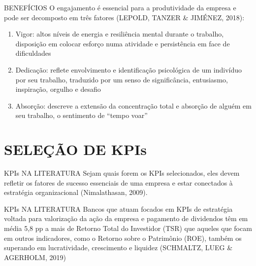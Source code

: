 \documentclass[
  ignorenonframetext,
]{beamer}
\providecommand{\tightlist}{%
  \setlength{\itemsep}{0pt}\setlength{\parskip}{0pt}}\usepackage{longtable,booktabs,array}
\begin{document}
\begin{frame}{BENEFÍCIOS}
\protect\hypertarget{benefuxedcios-2}{}
O engajamento é essencial para a produtividade da empresa e pode ser
decomposto em três fatores (LEPOLD, TANZER \& JIMÉNEZ, 2018):

\begin{enumerate}
\tightlist
\item
  Vigor: altos níveis de energia e resiliência mental durante o
  trabalho, disposição em colocar esforço numa atividade e persistência
  em face de dificuldades
\item
  Dedicação: reflete envolvimento e identificação psicológica de um
  indivíduo por seu trabalho, traduzido por um senso de significância,
  entusiasmo, inspiração, orgulho e desafio
\item
  Absorção: descreve a extensão da concentração total e absorção de
  alguém em seu trabalho, o sentimento de ``tempo voar''
\end{enumerate}
\end{frame}

\hypertarget{seleuxe7uxe3o-de-kpis}{%
\section{SELEÇÃO DE KPIs}\label{seleuxe7uxe3o-de-kpis}}

\begin{frame}{KPIs NA LITERATURA}
\protect\hypertarget{kpis-na-literatura}{}
Sejam quais forem os KPIs selecionados, eles devem refletir os fatores
de sucesso essenciais de uma empresa e estar conectados à estratégia
organizacional (Nimalathasan, 2009).
\end{frame}

\begin{frame}{KPIs NA LITERATURA}
\protect\hypertarget{kpis-na-literatura-1}{}
Bancos que atuam focados em KPIs de estratégia voltada para valorização
da ação da empresa e pagamento de dividendos têm em média 5,8 pp a mais
de Retorno Total do Investidor (TSR) que aqueles que focam em outros
indicadores, como o Retorno sobre o Patrimônio (ROE), também os
superando em lucratividade, crescimento e liquidez (SCHMALTZ, LUEG \&
AGERHOLM, 2019)
\end{frame}
\end{document}
